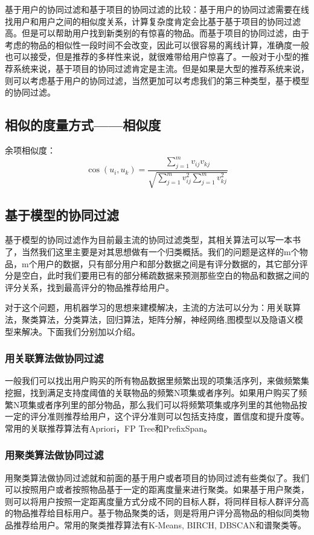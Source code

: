 \documentclass[12pt]{article}
\begin{document}
基于用户的协同过滤和基于项目的协同过滤的比较：基于用户的协同过滤需要在线找用户和用户之间的相似度关系，计算复杂度肯定会比基于基于项目的协同过滤高。但是可以帮助用户找到新类别的有惊喜的物品。而基于项目的协同过滤，由于考虑的物品的相似性一段时间不会改变，因此可以很容易的离线计算，准确度一般也可以接受，但是推荐的多样性来说，就很难带给用户惊喜了。一般对于小型的推荐系统来说，基于项目的协同过滤肯定是主流。但是如果是大型的推荐系统来说，则可以考虑基于用户的协同过滤，当然更加可以考虑我们的第三种类型，基于模型的协同过滤。

\subsection{相似的度量方式——相似度}
余项相似度：
$$
\cos(u_i, u_k) = \frac{\sum_{j=1}^mv_{ij}v_{kj}}{\sqrt{\sum_{j=1}^mv_{ij}^2\sum_{j=1}^mv_{kj}^2}}
$$

\subsection{基于模型的协同过滤}
基于模型的协同过滤作为目前最主流的协同过滤类型，其相关算法可以写一本书了，当然我们这里主要是对其思想做有一个归类概括。我们的问题是这样的m个物品，m个用户的数据，只有部分用户和部分数据之间是有评分数据的，其它部分评分是空白，此时我们要用已有的部分稀疏数据来预测那些空白的物品和数据之间的评分关系，找到最高评分的物品推荐给用户。

对于这个问题，用机器学习的思想来建模解决，主流的方法可以分为：用关联算法，聚类算法，分类算法，回归算法，矩阵分解，神经网络,图模型以及隐语义模型来解决。下面我们分别加以介绍。

\subsubsection{用关联算法做协同过滤}
一般我们可以找出用户购买的所有物品数据里频繁出现的项集活序列，来做频繁集挖掘，找到满足支持度阈值的关联物品的频繁N项集或者序列。如果用户购买了频繁N项集或者序列里的部分物品，那么我们可以将频繁项集或序列里的其他物品按一定的评分准则推荐给用户，这个评分准则可以包括支持度，置信度和提升度等。常用的关联推荐算法有Apriori，FP Tree和PrefixSpan。

\subsubsection{用聚类算法做协同过滤}
用聚类算法做协同过滤就和前面的基于用户或者项目的协同过滤有些类似了。我们可以按照用户或者按照物品基于一定的距离度量来进行聚类。如果基于用户聚类，则可以将用户按照一定距离度量方式分成不同的目标人群，将同样目标人群评分高的物品推荐给目标用户。基于物品聚类的话，则是将用户评分高物品的相似同类物品推荐给用户。常用的聚类推荐算法有K-Means, BIRCH, DBSCAN和谱聚类等。
\end{document}
